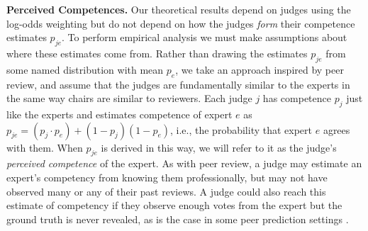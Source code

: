 \documentclass[letterpaper]{article} %
\newcommand{\judge}{\ensuremath{j} }
\newcommand{\expert}{\ensuremath{e} }
\begin{document}
\smallskip
\noindent
\textbf{Perceived Competences.\;}%
Our theoretical results depend on judges using the log-odds weighting but do not depend on how the judges \emph{form} their competence estimates $p_{\judge \expert}$.
%
To perform empirical analysis we must make assumptions about where these estimates come from.
%
Rather than drawing the estimates $p_{\judge \expert}$ from some named distribution with mean $p_\expert$, we take an approach inspired by peer review, and assume that the judges are fundamentally similar to the experts in the same way chairs are similar to reviewers.
%
Each judge $j$ has competence $p_j$ just like the experts and estimates competence of expert $\expert$ as $p_{\judge \expert} = (p_\judge \cdot p_\expert) + (1 - p_\judge)(1 - p_\expert)$, i.e., the probability that expert $\expert$ agrees with them.
%
When $p_{\judge \expert}$ is derived in this way, we will refer to it as the judge's \emph{perceived competence} of the expert.
%
As with peer review, a judge may estimate an expert's competency from knowing them professionally, but may not have observed many or any of their past reviews. A judge could also reach this estimate of competency if they observe enough votes from the expert but the ground truth is never revealed, as is the case in some peer prediction settings \cite{witkowski2012peer}.
\end{document}
